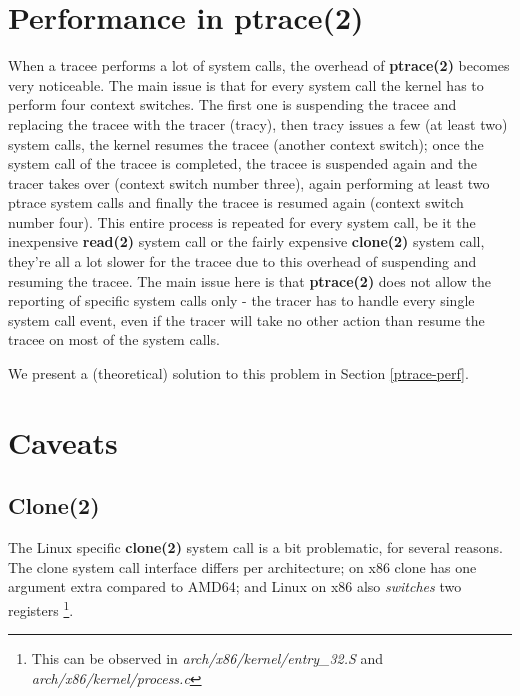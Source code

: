 \documentclass[a4paper, 10pt]{report}
\begin{document}



\section{Performance in ptrace(2)}
\label{ptrace-perf-problems}

When a tracee performs a lot of system calls, the overhead of \textbf{ptrace(2)}
becomes very noticeable. The main issue is that for every system call the kernel
has to perform four context switches. The first one is suspending the tracee
and replacing the tracee with the tracer (tracy), then tracy issues a few
(at least two) system calls, the kernel resumes the tracee (another context
switch); once the system call of the tracee is completed, the tracee is
suspended again and the tracer takes over (context switch number three),
again performing at least two ptrace system calls and finally the tracee
is resumed again (context switch number four). This entire process is
repeated for every system call, be it the inexpensive \textbf{read(2)}
system call or the fairly expensive \textbf{clone(2)} system call, they're
all a lot slower for the tracee due to this overhead of suspending and
resuming the tracee. The main issue here is that \textbf{ptrace(2)} does
not allow the reporting of specific system calls only - the tracer has
to handle every single system call event, even if the tracer will take no
other action than resume the tracee on most of the system calls.

We present a (theoretical) solution to this problem in
Section \ref{ptrace-perf}.

\section{Caveats}


\subsection{Clone(2)}

The Linux specific \textbf{clone(2)} system call is a bit problematic, for
several reasons. The clone system call interface differs per architecture;
on x86 clone has one argument extra compared to AMD64; and Linux on x86
also \textit{switches} two registers
\footnote{This can be observed in \textit{arch/x86/kernel/entry\_32.S}
and \textit{arch/x86/kernel/process.c}}.
\end{document}
